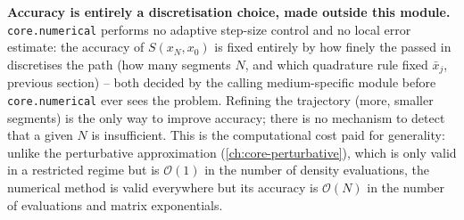 \begin{notebox}
\textbf{Accuracy is entirely a discretisation choice, made outside this
module.} \texttt{core.numerical} performs no adaptive step-size control and
no local error estimate: the accuracy of $S(x_N,x_0)$ is fixed entirely by
how finely the  passed in discretises the path (how
many segments $N$, and which quadrature rule fixed $\bar x_j$, previous
section) -- both decided by the calling medium-specific module before
\texttt{core.numerical} ever sees the problem. Refining the trajectory
(more, smaller segments) is the only way to improve accuracy; there is no
mechanism to detect that a given $N$ is insufficient. This is the
computational cost paid for generality: unlike the perturbative
approximation (\cref{ch:core-perturbative}), which is only valid in a
restricted regime but is $\mathcal{O}(1)$ in the number of density
evaluations, the numerical method is valid everywhere but its accuracy is
$\mathcal{O}(N)$ in the number of 
evaluations and matrix exponentials.
\end{notebox}
